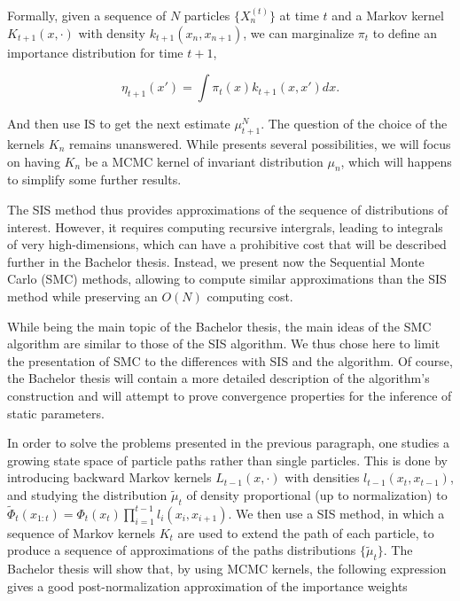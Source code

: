 \documentclass{article}
\begin{document}
Formally, given a sequence of $N$ particles $\{X_n^{(t)}\}$ at time $t$ and a Markov kernel $K_{t+1}(x, \cdot)$ with density $k_{t+1}(x_n, x_{n+1})$, we can marginalize $\pi_t$ to define an importance distribution for time $t+1$,

\begin{equation}
  \eta_{t+1}(x') = \int \pi_t(x) k_{t+1}(x, x')dx.
\end{equation}

And then use IS to get the next estimate $\mu_{t+1}^N$. The question of the choice of the kernels $K_n$ remains unanswered. While \cite{del_moral_2006} presents several possibilities, we will focus on having $K_n$ be a MCMC kernel of invariant distribution $\mu_n$, which will happens to simplify some further results.

The SIS method thus provides approximations of the sequence of distributions of interest. However, it requires computing recursive intergrals, leading to integrals of very high-dimensions, which can have a prohibitive cost that will be described further in the Bachelor thesis. Instead, we present now the Sequential Monte Carlo (SMC) methods, allowing to compute similar approximations than the SIS method while preserving an $O(N)$ computing cost.

While being the main topic of the Bachelor thesis, the main ideas of the SMC algorithm are similar to those of the SIS algorithm. We thus chose here to limit the presentation of SMC to the differences with SIS and the algorithm. Of course, the Bachelor thesis will contain a more detailed description of the algorithm's construction and will attempt to prove convergence properties for the inference of static parameters.

In order to solve the problems presented in the previous paragraph, one studies a growing state space of particle paths rather than single particles. This is done by introducing backward Markov kernels $L_{t-1}(x, \cdot)$ with densities $l_{t-1}(x_t, x_{t-1})$, and studying the distribution $\tilde{\mu}_t$ of density proportional (up to normalization) to $\tilde{\Phi}_t(x_{1:t}) = \Phi_t(x_t)\prod_{i=1}^{t-1}l_{i}(x_i, x_{i+1})$. We then use a SIS method, in which a sequence of Markov kernels $K_t$ are used to extend the path of each particle, to produce a sequence of approximations of the paths distributions $\{\tilde{\mu}_t\}$. The Bachelor thesis will show that, by using MCMC kernels, the following expression gives a good post-normalization approximation of the importance weights
\end{document}
